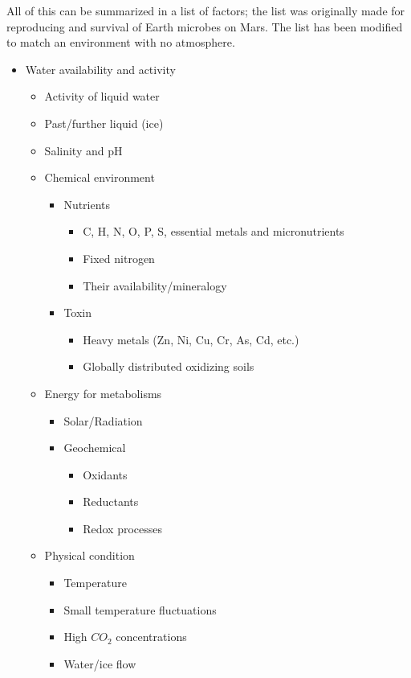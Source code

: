 All of this can be summarized in a list of factors; the list was originally made for reproducing and survival of Earth microbes on Mars. The list has been modified to match an environment with no atmosphere\cite{WaterMars}.
\begin{itemize}
  \item Water availability and activity
  \begin{itemize}
    \item Activity of liquid water
    \item Past/further liquid (ice)
    \item Salinity and pH
  \end{itemize}
  \begin{itemize}
    \item  Chemical environment
    \begin{itemize}
      \item Nutrients
      \begin{itemize}
        \item C, H, N, O, P, S, essential metals and micronutrients
        \item Fixed nitrogen
        \item Their availability/mineralogy
      \end{itemize}
      \item Toxin
      \begin{itemize}
        \item Heavy metals (Zn, Ni, Cu, Cr, As, Cd, etc.)
        \item Globally distributed oxidizing soils
      \end{itemize}
    \end{itemize}
  \end{itemize}
  \begin{itemize}
    \item  Energy for metabolisms
    \begin{itemize}
      \item Solar/Radiation
      \item Geochemical
      \begin{itemize}
        \item Oxidants
        \item Reductants
        \item Redox processes
      \end{itemize}
    \end{itemize}
  \end{itemize}
  \begin{itemize}
    \item Physical condition
    \begin{itemize}
      \item Temperature
      \item Small temperature fluctuations
      \item High $CO_2$ concentrations
      \item Water/ice flow
    \end{itemize}
  \end{itemize}
\end{itemize}
